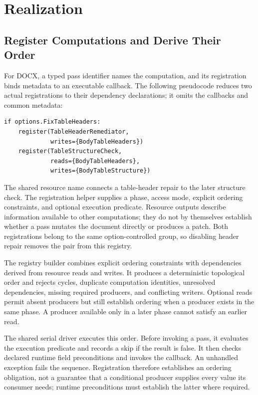 \section{Realization}

\subsection*{Register Computations and Derive Their Order}

For DOCX, a typed pass identifier names the computation, and its registration binds metadata to an executable callback. The following pseudocode reduces two actual registrations to their dependency declarations; it omits the callbacks and common metadata:

\begin{verbatim}
if options.FixTableHeaders:
    register(TableHeaderRemediator,
             writes={BodyTableHeaders})
    register(TableStructureCheck,
             reads={BodyTableHeaders},
             writes={BodyTableStructure})
\end{verbatim}

The shared resource name connects a table-header repair to the later structure check. The registration helper supplies a phase, access mode, explicit ordering constraints, and optional execution predicate. Resource outputs describe information available to other computations; they do not by themselves establish whether a pass mutates the document directly or produces a patch. Both registrations belong to the same option-controlled group, so disabling header repair removes the pair from this registry.

The registry builder combines explicit ordering constraints with dependencies derived from resource reads and writes. It produces a deterministic topological order and rejects cycles, duplicate computation identities, unresolved dependencies, missing required producers, and conflicting writers. Optional reads permit absent producers but still establish ordering when a producer exists in the same phase. A producer available only in a later phase cannot satisfy an earlier read.

The shared serial driver executes this order. Before invoking a pass, it evaluates the execution predicate and records a skip if the result is false. It then checks declared runtime field preconditions and invokes the callback. An unhandled exception fails the sequence. Registration therefore establishes an ordering obligation, not a guarantee that a conditional producer supplies every value its consumer needs; runtime preconditions must establish the latter where required.

